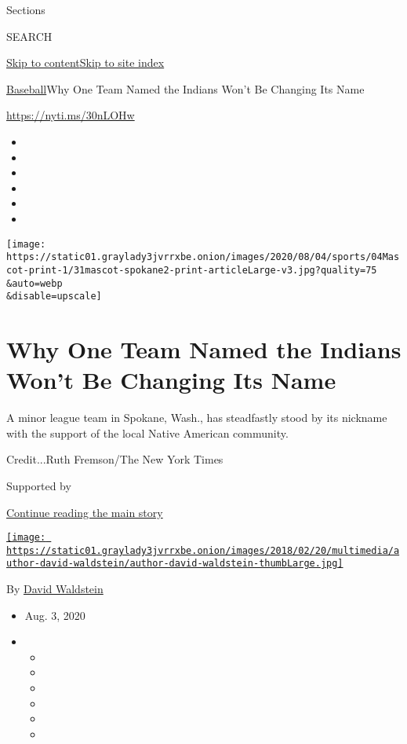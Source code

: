 Sections

SEARCH

\protect\hyperlink{site-content}{Skip to
content}\protect\hyperlink{site-index}{Skip to site index}

\href{/section/sports/baseball}{Baseball}\textbar{}Why One Team Named
the Indians Won't Be Changing Its Name

\url{https://nyti.ms/30nLOHw}

\begin{itemize}
\item
\item
\item
\item
\item
\item
\end{itemize}

\texttt{[image: https://static01.graylady3jvrrxbe.onion/images/2020/08/04/sports/04Mascot-print-1/31mascot-spokane2-print-articleLarge-v3.jpg?quality=75\\\&auto=webp\\\&disable=upscale]}

\hypertarget{why-one-team-named-the-indians-wont-be-changing-its-name}{%
\section{Why One Team Named the Indians Won't Be Changing Its
Name}\label{why-one-team-named-the-indians-wont-be-changing-its-name}}

A minor league team in Spokane, Wash., has steadfastly stood by its
nickname with the support of the local Native American community.

Credit...Ruth Fremson/The New York Times

Supported by

\protect\hyperlink{after-sponsor}{Continue reading the main story}

\href{https://www.nytimes3xbfgragh.onion/by/david-waldstein}{\texttt{[image: https://static01.graylady3jvrrxbe.onion/images/2018/02/20/multimedia/author-david-waldstein/author-david-waldstein-thumbLarge.jpg]}}

By \href{https://www.nytimes3xbfgragh.onion/by/david-waldstein}{David
Waldstein}

\begin{itemize}
\item
  Aug. 3, 2020
\item
  \begin{itemize}
  \item
  \item
  \item
  \item
  \item
  \item
  \end{itemize}
\end{itemize}

